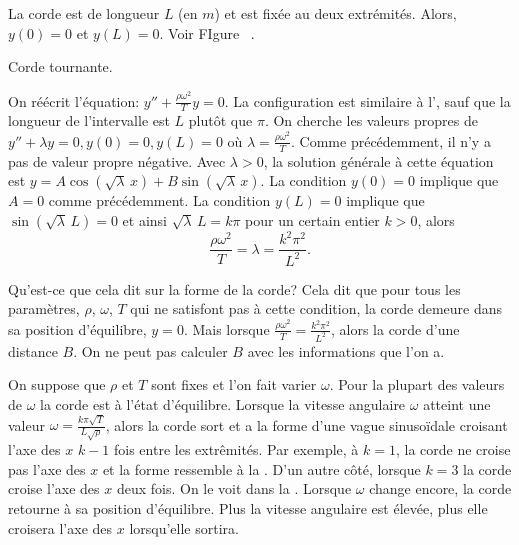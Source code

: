 La corde  est de longueur $L$ (en $m$) et est fixée au deux extrémités. Alors, $y(0) = 0$ et $y(L) = 0$.  Voir FIgure~
.

\begin{myfig}
\capstart
{}
\caption{Corde tournante.\label{bvp:whirstringfig}}
\end{myfig}

On réécrit l'équation: 
$y'' + \frac{\rho \omega^2}{T} y = 0$.
La configuration est similaire à l', sauf que  
la longueur de l'intervalle est $L$ plutôt que $\pi$.  On cherche les valeurs propres de  $y'' + \lambda y = 0, y(0) = 0, y(L) = 0$ où
$\lambda = \frac{\rho \omega^2}{T}$.  Comme précédemment, il n'y a pas de valeur propre négative. Avec $\lambda > 0$,
la solution générale à cette équation est $y = A \cos (  \sqrt{\lambda} \,x ) + B
\sin ( \sqrt{\lambda} \,x )$.  La condition $y(0) = 0$ implique que $A = 0$ comme précédemment. La condition $y(L) = 0$ implique que
$\sin ( \sqrt{\lambda} \, L) = 0$ et ainsi
$\sqrt{\lambda} \, L = k \pi$  pour un certain entier $k > 0$, alors
\begin{equation*}
\frac{\rho \omega^2}{T} = \lambda = \frac{k^2 \pi^2}{L^2} .
\end{equation*}

Qu'est-ce que cela dit sur la forme de la corde? Cela dit que pour tous les paramètres, $\rho$, $\omega$, $T$ qui ne satisfont pas à cette condition, la corde demeure dans sa position d'équilibre, $y=0$.  Mais lorsque 
$\frac{\rho \omega^2}{T} = \frac{k^2 \pi^2}{L^2}$, alors la corde  d'une distance $B$. On ne peut pas calculer $B$ avec les informations que l'on a. 

On suppose que  $\rho$ et $T$ sont fixes et l'on fait varier $\omega$.
Pour la plupart des valeurs de $\omega$ la corde est à l'état d'équilibre. Lorsque la vitesse angulaire  $\omega$ atteint une valeur $\omega = \frac{k \pi \sqrt{T}}{L\sqrt{\rho}}$, alors la corde sort et a la forme d'une vague sinusoïdale croisant l'axe des 
$x$ $k-1$ fois entre les extrêmités. Par exemple, à $k=1$, la corde ne croise pas l'axe des $x$ et la forme ressemble à la .
D'un autre côté, lorsque  $k=3$ la corde croise l'axe des  $x$ deux fois. On le voit dans la  .
Lorsque $\omega$ change encore, la corde retourne à sa position d'équilibre. Plus la vitesse angulaire est élevée, plus elle croisera l'axe des  $x$ lorsqu'elle sortira. 

